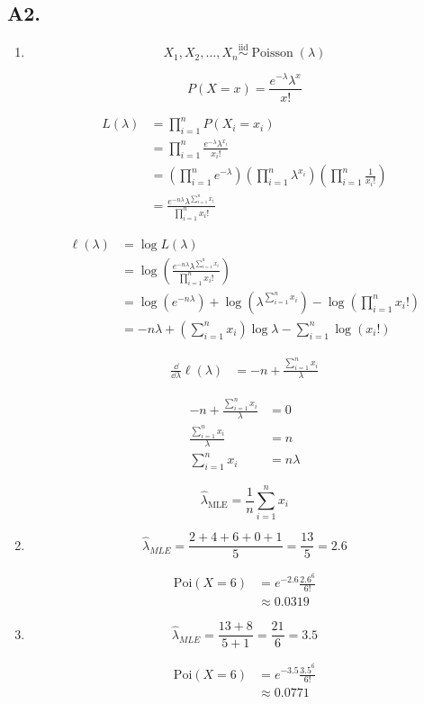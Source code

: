 \documentclass[fleqn]{article}
\begin{document}

\subsection*{A2.}

\begin{enumerate}[label=(\alph*)]
\item
\[
X_1, X_2, \dots, X_n \overset{\text{iid}}{\sim} \operatorname{Poisson}(\lambda)
\]

\[
P(X = x) = \frac{e^{-\lambda}\lambda^x}{x!}
\]

\begin{align*}
L(\lambda)
&= \prod_{i=1}^{n} P(X_i = x_i) \\
&= \prod_{i=1}^{n} \frac{e^{-\lambda}\lambda^{x_i}}{x_i!} \\
&= \left(\prod_{i=1}^{n} e^{-\lambda}\right)
   \left(\prod_{i=1}^{n} \lambda^{x_i}\right)
   \left(\prod_{i=1}^{n} \frac{1}{x_i!}\right) \\
&= \frac{e^{-n\lambda}\lambda^{\sum_{i=1}^{n}x_i}}{\prod_{i=1}^{n}x_i!}
\end{align*}

\begin{align*}
\ell(\lambda)
&= \log L(\lambda) \\
&= \log\left(\frac{e^{-n\lambda}\lambda^{\sum_{i=1}^{n}x_i}}{\prod_{i=1}^{n}x_i!}\right) \\
&= \log\left(e^{-n\lambda}\right)
   + \log\left(\lambda^{\sum_{i=1}^{n}x_i}\right)
   - \log\left(\prod_{i=1}^{n}x_i!\right) \\
&= -n\lambda + \left(\sum_{i=1}^{n}x_i\right)\log \lambda
   - \sum_{i=1}^{n}\log(x_i!)
\end{align*}

\begin{align*}
\frac{\dd}{\dd \lambda}\ell(\lambda)
&= -n + \frac{\sum_{i=1}^{n}x_i}{\lambda}
\end{align*}

\begin{align*}
-n + \frac{\sum_{i=1}^{n}x_i}{\lambda} &= 0 \\
\frac{\sum_{i=1}^{n}x_i}{\lambda} &= n \\
\sum_{i=1}^{n}x_i &= n\lambda
\end{align*}

\[
\hat{\lambda}_{\text{MLE}} = \frac{1}{n}\sum_{i=1}^{n}x_i
\]

\item
\[
\hat{\lambda}_{MLE}
= \frac{2+4+6+0+1}{5}
= \frac{13}{5}
= 2.6
\]

\begin{align*}
\mathrm{Poi}(X=6)
&= e^{-2.6}\frac{2.6^6}{6!} \\
&\approx 0.0319
\end{align*}

\item
\[
\hat{\lambda}_{MLE}
= \frac{13+8}{5+1}
= \frac{21}{6}
= 3.5
\]

\begin{align*}
\mathrm{Poi}(X=6)
&= e^{-3.5}\frac{3.5^6}{6!} \\
&\approx 0.0771
\end{align*}
\end{enumerate}
\end{document}
